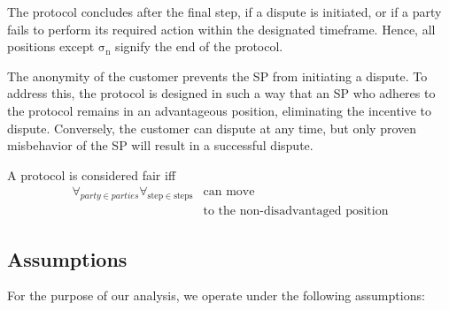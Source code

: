 \documentclass[pdftex,twocolumn,epjc3]{svjour3}
\begin{document}
{The protocol concludes after the final step, if a dispute is initiated, or if a party fails to perform its required action within the designated timeframe. Hence, all positions except $\mathrm{\sigma_n}$ signify the end of the protocol.

The anonymity of the customer prevents the SP from initiating a dispute. To address this, the protocol is designed in such a way that an SP who adheres to the protocol remains in an advantageous position, eliminating the incentive to dispute. Conversely, the customer can dispute at any time, but only proven misbehavior of the SP will result in a successful dispute.


\begin{definition}[Fairness] \label{def:fairness}
A protocol is considered fair iff 
\begin{equation*}
\begin{split}
\forall_{party \in parties}\forall_{\mathrm{step} \in \mathrm{steps}} &\operatorname{can\ move}\\
&\operatorname{to\ the\ non-disadvantaged\ position} 
\end{split}
\end{equation*}

\end{definition}

\subsection{Assumptions}\label{sec:assumptions}

For the purpose of our analysis, we operate under the following assumptions:

}
\end{document}
